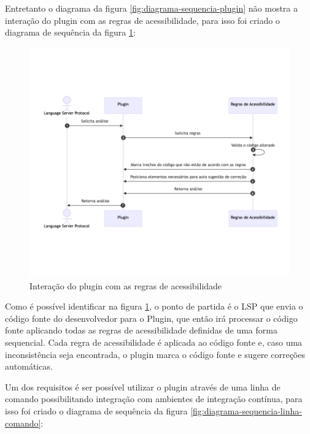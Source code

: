 Entretanto o diagrama da figura \ref{fig:diagrama-sequencia-plugin} não mostra a interação do plugin com as regras de acessibilidade, para isso foi criado o diagrama de sequência da figura \ref{fig:diagrama-sequencia-regra-acessibilidade}:

\begin{figure}[!h]
  \centering
  \caption{Interação do plugin com as regras de acessibilidade}\label{fig:diagrama-sequencia-regra-acessibilidade}
  \includegraphics[width=325pt]{Assets/DiagramaPluginRegrasAcessibilidade.png}
\end{figure}

Como é possível identificar na figura \ref{fig:diagrama-sequencia-regra-acessibilidade}, o ponto de partida é o LSP que envia o código fonte do desenvolvedor para o Plugin, que então irá processar o código fonte aplicando todas as regras de acessibilidade definidas de uma forma sequencial. Cada regra de acessibilidade é aplicada ao código fonte e, caso uma inconsistência seja encontrada, o plugin marca o código fonte e sugere correções automáticas.

Um dos requisitos é ser possível utilizar o plugin através de uma linha de comando possibilitando integração com ambientes de integração contínua, para isso foi criado o diagrama de sequência da figura \ref{fig:diagrama-sequencia-linha-comando}:

